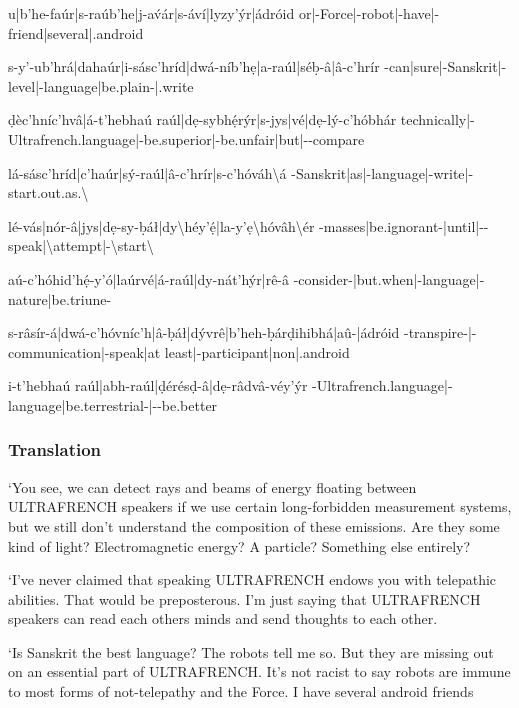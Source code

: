 \documentclass[a4paper, 12pt, twoside, final]{article}
\let \Sl \textbackslash
\begin{document}
{    u|b’he-faúr|s-raúb’he|j-av́ár|s-áví|lyzy’ýr|ádróid
    or|-Force|-robot|-have|-friend|several|.android

    s-y’-ub’hrá|dahaúr|i-sásc’hríd|dwá-níb’hẹ|a-raúl|séḅ-â|â-c’hrír
    -can|sure|-Sanskrit|-level|-language|be.plain-|.write

    ḍèc’hníc’hvâ|á-t’hebhaú raúl|dẹ-sybhẹ́rýr|s-jys|vé|dẹ-lý-c’hóbhár
    technically|-Ultrafrench.language|-be.superior|-be.unfair|but|--compare

    lá-sásc’hríd|c’haúr|sý-raúl|â-c’hrír|s-c’hóváh\Sl á
    -Sanskrit|as|-language|-write|-start.out.as.\Sl {}

    lé-vás|nór-â|jys|dẹ-sy-ḅáł|dy\Sl héy’ẹ́|la-y’ẹ\Sl hóvâh\Sl ér
    -masses|be.ignorant-|until|--speak|\Sl attempt|-\Sl start\Sl {}

    aú-c’hóhid’hẹ́-y’ó|laúrvé|á-raúl|dy-nát’hýr|rê-â
    -consider-|but.when|-language|-nature|be.triune-

    s-râsír-á|dwá-c’hóvníc’h|â-ḅáł|dývrê|b’heh-ḅárḍihibhá|aû-|ádróid
    -transpire-|-communication|-speak|at least|-participant|non|.android

    i-t’hebhaú raúl|abh-raúl|ḍérésḍ-â|dẹ-râdvâ-véy’ýr
    -Ultrafrench.language|-language|be.terrestrial-|--be.better
}

\subsubsection{Translation}
‘You see, we can detect rays and beams of energy floating between ULTRAFRENCH speakers if we use certain long-forbidden
measurement systems, but we still don’t understand the composition of these emissions. Are they some kind of light?
Electromagnetic energy? A particle? Something else entirely?

‘I’ve never claimed that speaking ULTRAFRENCH endows you with telepathic abilities. That would be preposterous. I’m just
saying that ULTRAFRENCH speakers can read each others minds and send thoughts to each other.

‘Is Sanskrit the best language? The robots tell me so.  But they are missing out on an essential part of ULTRAFRENCH.
It’s not racist to say robots are immune to most forms of not-telepathy and the Force. I have several android friends
\end{document}
